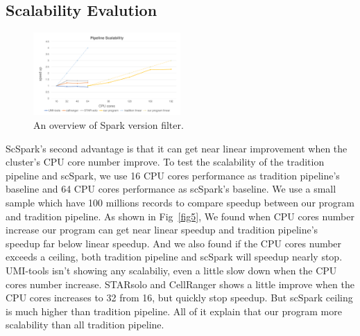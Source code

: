 \documentclass[conference]{IEEEtran}
\begin{document}
\subsection{Scalability Evalution}
\begin{figure}
  \includegraphics[width=0.5\textwidth]{fig4.pdf}
  \caption{An overview of Spark version filter.} \label{fig4}
\end{figure}
ScSpark's second advantage is that it can get near linear improvement when the cluster's CPU core number improve. 
To test the scalability of the tradition pipeline and scSpark, we use 16 CPU cores performance as tradition pipeline's baseline and 64 CPU cores performance as scSpark's baseline. 
We use a small sample which have 100 millions records to compare speedup between our program and tradition pipeline. 
As shown in Fig~\ref{fig5}, We found when CPU cores number increase our program can get near linear speedup and tradition pipeline's speedup far below linear speedup. 
And we also found if the CPU cores number exceeds a ceiling, both tradition pipeline and scSpark will speedup nearly stop. 
UMI-tools isn't showing any scalabiliy, even a little slow down when the CPU cores number increase. 
STARsolo and CellRanger shows a little improve when the CPU cores increases to 32 from 16, but quickly stop speedup. 
But scSpark ceiling is much higher than tradition pipeline. 
All of it explain that our program more scalability than all tradition pipeline. 
\end{document}
